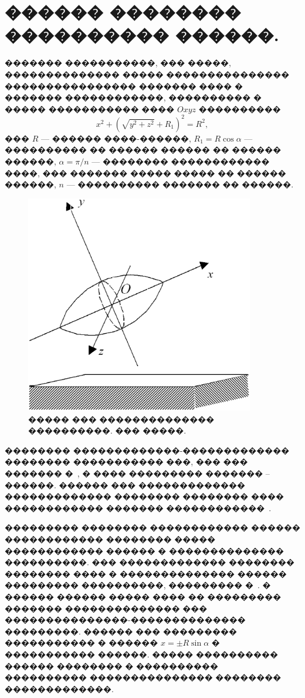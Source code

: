 \documentclass[12pt,a4paper]{article}
\begin{document}
\section{������ �������� ���������� ������.\ }
\label{sec3}
������� �����������, ��� �����, �������������� ����� ��������������� 
���������������� ������� ���� � ������� ������������, ���������� � ����� 
����������� ���� $Oxyz$ ����������
\begin{equation}
x^2+\left(\sqrt{y^2+z^2}+R_1\right) ^2=R^2,
\label{3_1}
\end{equation}
��� $R$ --- ������ ����-������, $R_1=R\cos{\alpha }$ --- ���������� �� ������
������ �� ������ ������, $\alpha =\pi /n$ --- �������� ������������ ����, ���
������� ����� ����� �� ������ ������, $n$ --- ���������� ������� �� ������.
\begin{figure}[htb]
\centering\includegraphics[width=10cm]{Roller.eps}
\caption{����� ��� �������������� ����������. ��� �����.}
\label{Roller}
\end{figure}

�������� �������������-������������� �������� ����������� ���, ��� ��� �������
�~\cite{Kosenko2007}, � ���� ��������� ������� -- ������. ������ ��� 
������������� ������������� �������� �������� ���� ������������ ������� 
������������~\cite{Kosenko}.

��������� �������� ������������ ������ ������������ �������� ����� ������������ 
������ � �������������� ����������. ��� ������������� �������� �������� ���� �
�������������� ������ ��������� ����������, ��������� �~\cite{Kosenko2006}. �
������ ������ ����� ���� �� ��������� ������� �������������� ��� 
���������������-�������������� ���������. ������ ��� ��������� ����������� � 
������ $x=\pm R\sin\alpha $ � ����������� ������. ����� ���������� ������ 
�������� � ���������� ���������� ��������������� �������� �������������.
\end{document}
